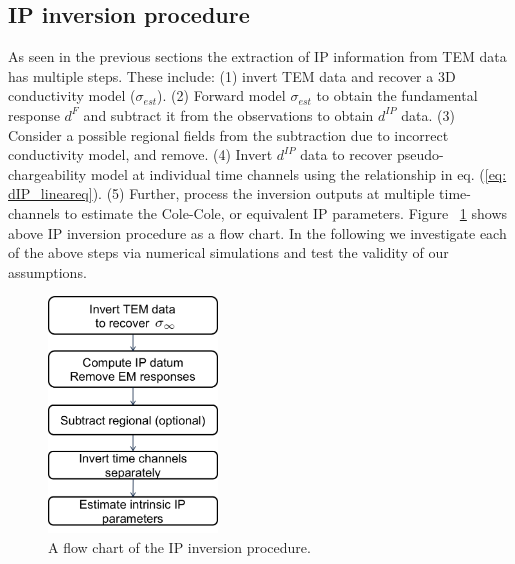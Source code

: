 \documentclass[letterpaper,11pt]{article}
\newcommand{\dip}{d^{IP}}
\begin{document}
\subsection{IP inversion procedure}
As seen in the previous sections the extraction of IP information from TEM data has multiple steps. These include: (1) invert TEM data and recover a 3D conductivity model ($\sigma_{est}$). 
(2) Forward model $\sigma_{est}$ to obtain the fundamental response $d^F$ and subtract it from the observations to obtain $\dip$ data.
(3) Consider a possible regional fields from the subtraction due to incorrect conductivity model, and remove.
(4) Invert  $\dip$ data to recover pseudo-chargeability model at individual time channels using the relationship in eq. (\ref{eq: dIP_lineareq}). 
(5) Further, process the inversion outputs at multiple time-channels  to estimate the Cole-Cole, or equivalent IP parameters.
Figure ~\ref{F:IPprocedure} shows above IP inversion procedure as a flow chart. 
In the following we investigate each of the above steps via numerical simulations and test the validity of our assumptions. 
\begin{figure}  
  \centering
  \includegraphics[width=0.4\textwidth]{figures/IPprocedure.png} 
  \caption{A flow chart of the IP inversion procedure.}
  \label{F:IPprocedure}
\end{figure}   
\end{document}
